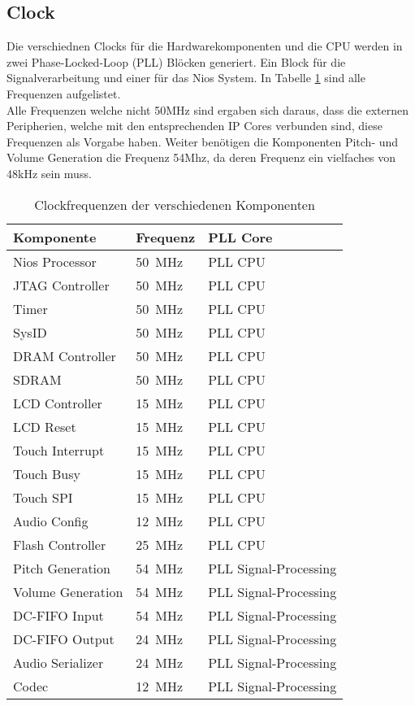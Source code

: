 \subsection{Clock}\label{subsec:Clock}
Die verschiednen Clocks für die Hardwarekomponenten und die CPU werden in zwei Phase-Locked-Loop (PLL) Blöcken generiert. Ein Block für die Signalverarbeitung und einer für das Nios System. In Tabelle \ref{tab:clocks} sind alle Frequenzen aufgelistet. \\
Alle Frequenzen welche nicht 50MHz sind ergaben sich daraus, dass die externen Peripherien, welche mit den entsprechenden IP Cores verbunden sind, diese Frequenzen als Vorgabe haben. Weiter benötigen die Komponenten Pitch- und Volume Generation die Frequenz 54Mhz, da deren Frequenz ein vielfaches von 48kHz sein muss.

\begin{table}[H]
	\centering
	\caption{Clockfrequenzen der verschiedenen Komponenten}
	\label{tab:clocks}
	\begin{tabular}{l|l|l}
		\textbf{Komponente} & \textbf{Frequenz} & \textbf{PLL Core} \\
		\hline\hline
		Nios Processor & \SI{50}{MHz} & PLL CPU  \\ \hline
		JTAG Controller & \SI{50}{MHz} & PLL CPU \\ \hline
		Timer & \SI{50}{MHz} & PLL CPU \\ \hline
		SysID & \SI{50}{MHz} & PLL CPU \\ \hline
		DRAM Controller & \SI{50}{MHz} & PLL CPU \\ \hline
		SDRAM & \SI{50}{MHz} & PLL CPU \\ \hline
		LCD Controller & \SI{15}{MHz} & PLL CPU \\ \hline
		LCD Reset & \SI{15}{MHz} & PLL CPU \\ \hline
		Touch Interrupt & \SI{15}{MHz} & PLL CPU \\ \hline
		Touch Busy & \SI{15}{MHz} & PLL CPU \\ \hline
		Touch SPI & \SI{15}{MHz} & PLL CPU \\ \hline
		Audio Config & \SI{12}{MHz} & PLL CPU \\ \hline
		Flash Controller & \SI{25}{MHz} & PLL CPU \\ \hline
		Pitch Generation & \SI{54}{MHz} & PLL Signal-Processing \\ \hline
		Volume Generation & \SI{54}{MHz} & PLL Signal-Processing \\ \hline
		DC-FIFO Input	& \SI{54}{MHz} & PLL Signal-Processing \\ \hline
		DC-FIFO Output	& \SI{24}{MHz} & PLL Signal-Processing \\ \hline
	 	Audio Serializer	& \SI{24}{MHz} & PLL Signal-Processing \\ \hline
	 	Codec	& \SI{12}{MHz} & PLL Signal-Processing \\ \hline
		
	\end{tabular}
\end{table}
